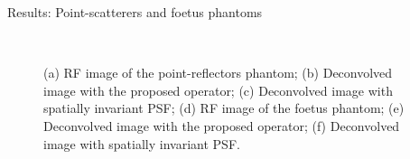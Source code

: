 {\begin{block}{Results: Point-scatterers and foetus phantoms}
\begin{figure}
		~
		\caption{(a) RF image of the point-reflectors phantom; (b) Deconvolved image with the proposed operator; (c) Deconvolved image with spatially invariant PSF; (d) RF image of the foetus phantom; (e) Deconvolved image with the proposed operator; (f) Deconvolved image with spatially invariant PSF.}
	\end{figure}


\end{block}}
